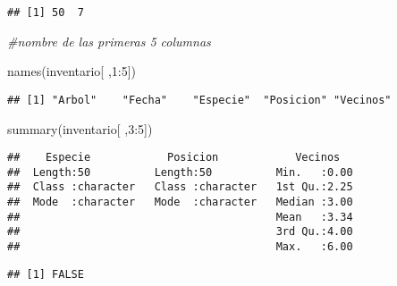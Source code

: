 \documentclass[
]{article}
\newenvironment{Shaded}{\begin{snugshade}}{\end{snugshade}}
\newcommand{\CommentTok}[1]{\textcolor[rgb]{0.56,0.35,0.01}{\textit{#1}}}
\newcommand{\DecValTok}[1]{\textcolor[rgb]{0.00,0.00,0.81}{#1}}
\newcommand{\FunctionTok}[1]{\textcolor[rgb]{0.00,0.00,0.00}{#1}}
\newcommand{\NormalTok}[1]{#1}
\newcommand{\OtherTok}[1]{\textcolor[rgb]{0.56,0.35,0.01}{#1}}
\newcommand{\SpecialCharTok}[1]{\textcolor[rgb]{0.00,0.00,0.00}{#1}}
\begin{document}
\begin{verbatim}
## [1] 50  7
\end{verbatim}

\begin{Shaded}
\begin{Highlighting}[]
\CommentTok{\#nombre de las primeras 5 columnas}

\FunctionTok{names}\NormalTok{(inventario[ ,}\DecValTok{1}\SpecialCharTok{:}\DecValTok{5}\NormalTok{])}
\end{Highlighting}
\end{Shaded}

\begin{verbatim}
## [1] "Arbol"    "Fecha"    "Especie"  "Posicion" "Vecinos"
\end{verbatim}

\begin{Shaded}
\begin{Highlighting}[]
\FunctionTok{summary}\NormalTok{(inventario[ ,}\DecValTok{3}\SpecialCharTok{:}\DecValTok{5}\NormalTok{])}
\end{Highlighting}
\end{Shaded}

\begin{verbatim}
##    Especie            Posicion            Vecinos    
##  Length:50          Length:50          Min.   :0.00  
##  Class :character   Class :character   1st Qu.:2.25  
##  Mode  :character   Mode  :character   Median :3.00  
##                                        Mean   :3.34  
##                                        3rd Qu.:4.00  
##                                        Max.   :6.00
\end{verbatim}

\begin{Shaded}
\end{Shaded}

\begin{verbatim}
## [1] FALSE
\end{verbatim}

\begin{Shaded}
\end{Shaded}
\end{document}
